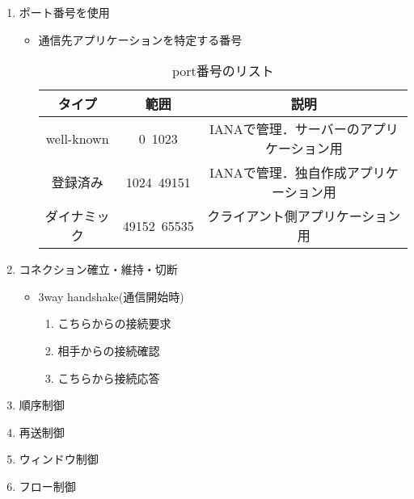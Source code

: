 \begin{enumerate}
    \item ポート番号を使用
    \begin{itemize}
        \item 通信先アプリケーションを特定する番号
        \begin{table}
            \centering
            \caption{port番号のリスト}
            \label{tab:tcp_port}
            \begin{tabular}{ccc}
                タイプ & 範囲 & 説明 \\ \hline
                well-known & 0~1023 & IANAで管理．サーバーのアプリケーション用 \\
                登録済み & 1024~49151 & IANAで管理．独自作成アプリケーション用 \\
                ダイナミック & 49152~65535 & クライアント側アプリケーション用 \\
            \end{tabular}
        \end{table}
    \end{itemize}
    \item コネクション確立・維持・切断
    \begin{itemize}
        \item 3way handshake(通信開始時)
        \begin{enumerate}
            \item こちらからの接続要求
            \item 相手からの接続確認
            \item こちらから接続応答
        \end{enumerate}
    \end{itemize}
    \item 順序制御
    \item 再送制御
    \item ウィンドウ制御
    \item フロー制御
\end{enumerate}

